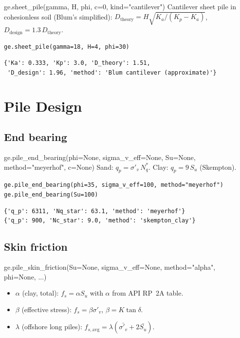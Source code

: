 \documentclass[11pt,a4paper,openany]{book}
\newcommand{\sigmavp}{\sigma'_v}
\begin{document}
\begin{funcbox}{ge.sheet\_pile(gamma, H, phi, c=0, kind="cantilever")}
Cantilever sheet pile in cohesionless soil (Blum's simplified):
$D_{\text{theory}} = H\sqrt{K_a / (K_p - K_a)}$,
$D_{\text{design}} = 1.3\,D_{\text{theory}}$.
\end{funcbox}

\begin{lstlisting}
ge.sheet_pile(gamma=18, H=4, phi=30)
\end{lstlisting}
\begin{lstlisting}[style=output]
{'Ka': 0.333, 'Kp': 3.0, 'D_theory': 1.51,
 'D_design': 1.96, 'method': 'Blum cantilever (approximate)'}
\end{lstlisting}

\chapter{Pile Design}\label{ch:piles}

\section{End bearing}

\begin{funcbox}{ge.pile\_end\_bearing(phi=None, sigma\_v\_eff=None, Su=None, method="meyerhof", c=None)}
Sand: $q_p = \sigmavp\,N_q^*$. Clay: $q_p = 9\,S_u$ (Skempton).
\end{funcbox}

\begin{lstlisting}
ge.pile_end_bearing(phi=35, sigma_v_eff=100, method="meyerhof")
ge.pile_end_bearing(Su=100)
\end{lstlisting}
\begin{lstlisting}[style=output]
{'q_p': 6311, 'Nq_star': 63.1, 'method': 'meyerhof'}
{'q_p': 900, 'Nc_star': 9.0, 'method': 'skempton_clay'}
\end{lstlisting}

\section{Skin friction}

\begin{funcbox}{ge.pile\_skin\_friction(Su=None, sigma\_v\_eff=None, method="alpha", phi=None, ...)}
\begin{itemize}
\item $\alpha$ (clay, total): $f_s = \alpha S_u$ with $\alpha$ from
      API RP~2A table.
\item $\beta$ (effective stress): $f_s = \beta\sigmavp$,
      $\beta = K\tan\delta$.
\item $\lambda$ (offshore long piles):
      $f_{s,\text{avg}} = \lambda(\bar{\sigmavp} + 2\bar{S_u})$.
\end{itemize}
\end{funcbox}
\end{document}

